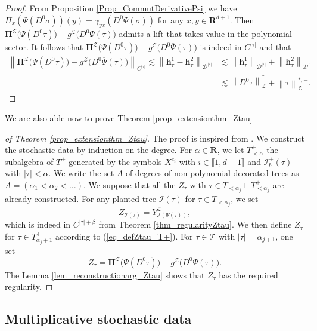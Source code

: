 \documentclass[11pt]{preprint}
\newcommand{\mcI}{\mathcal{I}}
\newcommand{\mcD}{\mathcal{D}}
\newcommand{\mcZ}{\mathcal{Z}}
\newcommand{\mcT}{\mathcal{T}}
\def\PPi{\boldsymbol{\Pi}}
\def\eqref#1{(\ref{#1})}
\newcommand{\bfR}{\mathbf{R}}
\newcommand{\norme}[1]{\left\lVert #1 \right\lVert}
\newcommand{\bbrack}[1]{ \llbracket #1 \rrbracket }
\begin{document}
\begin{proof}
	From Proposition \ref{Prop_CommutDerivativePsi} we have $\Pi_x(\Psi(D^0\sigma))(y) = \gamma_{yx}(D^0\Psi(\sigma))$ for any $x,y\in\bfR^{d+1}$.
	Then $\PPi^\mcZ\big(\Psi(D^0\tau)\big) - g^\mcZ\big(D^0\overline{\Psi}(\tau)\big)$ admits a lift that takes value in the polynomial sector. It follows  that $\PPi^\mcZ\big(\Psi(D^0\tau)\big) - g^\mcZ\big(D^0\overline{\Psi}(\tau)\big)$ is indeed in $C^{|\tau|}$ and that
	\begin{align*}
\norme{ \PPi^\mcZ\big(\Psi(D^0\tau)\big) - g^\mcZ\big(D^0\overline{\Psi}(\tau)\big) }_{C^{|\tau|}} \lesssim \norme{{\bm h}_\tau^1-{\bm h}_\tau^2}_{\mcD^{|\tau|}}&\lesssim \norme{{\bm h}_\tau^1}_{\mcD^{|\tau|}}+\norme{{\bm h}_\tau^2}_{\mcD^{|\tau|}}
\\
&\lesssim  \norme{D^0\tau}_\mcZ^*+ \norme{\tau}^{*,-}_\mcZ.
	\end{align*}
\end{proof}


We are also able now to prove Theorem \ref{prop_extensionthm_Ztau}
\begin{proof}[of Theorem \ref{prop_extensionthm_Ztau}]
	The proof is inspired from \cite{BailleulHoshinoRS1}. We construct the stochastic data by induction on the degree.
	For $\alpha\in\bfR$, we let $T_{<\alpha}^+$ the subalgebra of $T^+$ generated by the symbols $X^{e_i}$ with $i\in\bbrack{1,d+1}$ and $\mcI_b^+(\tau)$ with $|\tau|<\alpha$.
		We write the set $A$ of degrees of non polynomial decorated trees as  $A=(\alpha_1<\alpha_2<\dots)$.
	We suppose that all the $Z_\tau$ with $\tau\in T_{<\alpha_j}\sqcup T^+_{<\alpha_j}$ are already constructed. 
	For any planted tree $\mcI(\tau)$ for $\tau\in T_{<\alpha_j}$, we set 
	$$
	Z_{\mcI(\tau)} = Y^\mcZ_{\mcI(\Psi(\tau))},
	$$
	which is indeed in $C^{|\tau|+\beta}$ from Theorem \ref{thm_regularityZtau}.
	We then define $Z_\tau$ for $\tau\in T^+_{\alpha_j+1}$ according to \eqref{eq_defZtau_T+}. 
	For $\tau\in\mcT$ with $|\tau|=\alpha_{j+1}$, one set
	$$
	Z_\tau = { \PPi^\mcZ\big(\Psi(D^0\tau)\big) - g^\mcZ\big(D^0\overline{\Psi}(\tau)\big) } .
	$$
	The Lemma \ref{lem_reconstructionarg_Ztau} shows that $Z_\tau$ has the required regularity.
\end{proof}

	
	
	
\subsection{Multiplicative stochastic data}
\end{document}
